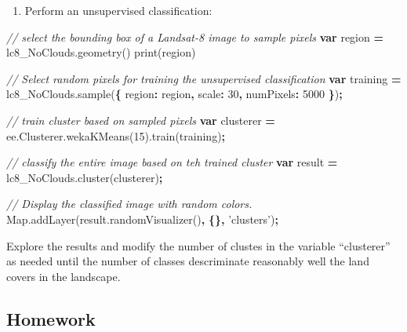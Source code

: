 \documentclass[]{article}
\newenvironment{Shaded}{\begin{snugshade}}{\end{snugshade}}
\newcommand{\AttributeTok}[1]{\textcolor[rgb]{0.77,0.63,0.00}{#1}}
\newcommand{\CommentTok}[1]{\textcolor[rgb]{0.56,0.35,0.01}{\textit{#1}}}
\newcommand{\DataTypeTok}[1]{\textcolor[rgb]{0.13,0.29,0.53}{#1}}
\newcommand{\DecValTok}[1]{\textcolor[rgb]{0.00,0.00,0.81}{#1}}
\newcommand{\KeywordTok}[1]{\textcolor[rgb]{0.13,0.29,0.53}{\textbf{#1}}}
\newcommand{\NormalTok}[1]{#1}
\newcommand{\OperatorTok}[1]{\textcolor[rgb]{0.81,0.36,0.00}{\textbf{#1}}}
\newcommand{\StringTok}[1]{\textcolor[rgb]{0.31,0.60,0.02}{#1}}
\newcommand{\VariableTok}[1]{\textcolor[rgb]{0.00,0.00,0.00}{#1}}
\providecommand{\tightlist}{%
  \setlength{\itemsep}{0pt}\setlength{\parskip}{0pt}}
\begin{document}
\begin{enumerate}
\def\labelenumi{\arabic{enumi}.}
\setcounter{enumi}{7}
\tightlist
\item
  Perform an unsupervised classification:
\end{enumerate}

\begin{Shaded}
\begin{Highlighting}[]
\CommentTok{// select the bounding box of a Landsat-8 image to sample pixels}
\KeywordTok{var}\NormalTok{ region }\OperatorTok{=} \VariableTok{lc8_NoClouds}\NormalTok{.}\AttributeTok{geometry}\NormalTok{()}
\AttributeTok{print}\NormalTok{(region)}

\CommentTok{// Select random pixels for training the unsupervised classification}
\KeywordTok{var}\NormalTok{ training }\OperatorTok{=} \VariableTok{lc8_NoClouds}\NormalTok{.}\AttributeTok{sample}\NormalTok{(}\OperatorTok{\{}
  \DataTypeTok{region}\OperatorTok{:}\NormalTok{ region}\OperatorTok{,}
  \DataTypeTok{scale}\OperatorTok{:} \DecValTok{30}\OperatorTok{,}
  \DataTypeTok{numPixels}\OperatorTok{:} \DecValTok{5000}
\OperatorTok{\}}\NormalTok{)}\OperatorTok{;}

\CommentTok{// train cluster based on sampled pixels}
\KeywordTok{var}\NormalTok{ clusterer }\OperatorTok{=} \VariableTok{ee}\NormalTok{.}\VariableTok{Clusterer}\NormalTok{.}\AttributeTok{wekaKMeans}\NormalTok{(}\DecValTok{15}\NormalTok{).}\AttributeTok{train}\NormalTok{(training)}\OperatorTok{;}

\CommentTok{// classify the entire image based on teh trained cluster}
\KeywordTok{var}\NormalTok{ result }\OperatorTok{=} \VariableTok{lc8_NoClouds}\NormalTok{.}\AttributeTok{cluster}\NormalTok{(clusterer)}\OperatorTok{;}

\CommentTok{// Display the classified image with random colors.}
\VariableTok{Map}\NormalTok{.}\AttributeTok{addLayer}\NormalTok{(}\VariableTok{result}\NormalTok{.}\AttributeTok{randomVisualizer}\NormalTok{()}\OperatorTok{,} \OperatorTok{\{\},} \StringTok{'clusters'}\NormalTok{)}\OperatorTok{;}
\end{Highlighting}
\end{Shaded}

Explore the results and modify the number of clustes in the variable
``clusterer'' as needed until the number of classes descriminate
reasonably well the land covers in the landscape.

\hypertarget{homework}{%
\subsection{Homework}\label{homework}}
\end{document}
